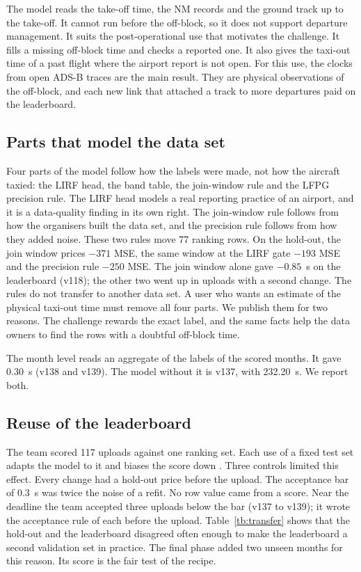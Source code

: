 \documentclass[
  manuscript=article,
  layout=preprint,
  year=2026,
  volume=x,
]{extra/joas}
\begin{document}
The model reads the take-off time, the NM records and the ground track up to the take-off. It cannot run before the off-block, so it does not support departure management. It suits the post-operational use that motivates the challenge. It fills a missing off-block time and checks a reported one. It also gives the taxi-out time of a past flight where the airport report is not open. For this use, the clocks from open ADS-B traces are the main result. They are physical observations of the off-block, and each new link that attached a track to more departures paid on the leaderboard.

\subsection{Parts that model the data set}

Four parts of the model follow how the labels were made, not how the aircraft taxied: the LIRF head, the band table, the join-window rule and the LFPG precision rule. The LIRF head models a real reporting practice of an airport, and it is a data-quality finding in its own right. The join-window rule follows from how the organisers built the data set, and the precision rule follows from how they added noise. These two rules move 77 ranking rows. On the hold-out, the join window prices $-371$ MSE, the same window at the LIRF gate $-193$ MSE and the precision rule $-250$ MSE. The join window alone gave $-0.85$~s on the leaderboard (v118); the other two went up in uploads with a second change. The rules do not transfer to another data set. A user who wants an estimate of the physical taxi-out time must remove all four parts. We publish them for two reasons. The challenge rewards the exact label, and the same facts help the data owners to find the rows with a doubtful off-block time.

The month level reads an aggregate of the labels of the scored months. It gave 0.30~s (v138 and v139). The model without it is v137, with 232.20~s. We report both.

\subsection{Reuse of the leaderboard}

The team scored 117 uploads against one ranking set. Each use of a fixed test set adapts the model to it and biases the score down \cite{blum2015ladder,dwork2015reusable}. Three controls limited this effect. Every change had a hold-out price before the upload. The acceptance bar of 0.3~s was twice the noise of a refit. No row value came from a score. Near the deadline the team accepted three uploads below the bar (v137 to v139); it wrote the acceptance rule of each before the upload. Table~\ref{tb:transfer} shows that the hold-out and the leaderboard disagreed often enough to make the leaderboard a second validation set in practice. The final phase added two unseen months for this reason. Its score is the fair test of the recipe.
\end{document}
